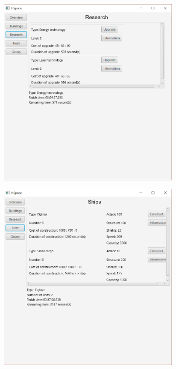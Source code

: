 \begin{figure}[H]
\begin{subfigure}[b]{0.28\textwidth}
\end{subfigure}
\begin{subfigure}[b]{0.28\textwidth} 
\includegraphics[width=1\textwidth]{../screenshots/3.png}
\end{subfigure}
\begin{subfigure}[b]{0.28\textwidth} 
\includegraphics[width=1\textwidth]{../screenshots/4.png}

\end{subfigure}
\end{figure}
